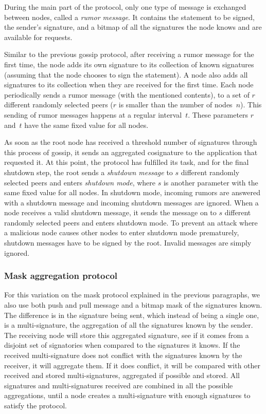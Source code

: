During the main part of the protocol, only one type of message is exchanged between nodes, called a \emph{rumor message}.
It contains the statement to be signed, the sender's  signature, and a bitmap of all the signatures the node knows and are available for requests. 

Similar to the previous gossip protocol, after receiving a rumor message for the first time, the node adds its own signature to its collection of known signatures (assuming that the node chooses to sign the statement).
A node also adds all signatures to its collection when they are received for the first time.
Each node periodically sends a rumor message (with the mentioned contents), to a set of $r$ different randomly selected peers ($r$ is smaller than the number of nodes~$n$).
This sending of rumor messages happens at a regular interval~$t$. These parameters $r$ and~$t$ have the same fixed value for all nodes.

As soon as the root node has received a threshold number of signatures through this process of gossip, it sends an aggregated cosignature to the application that requested it.
At this point, the protocol has fulfilled its task, and for the final shutdown step, the root sends a \emph{shutdown message} to $s$ different randomly selected peers and enters \emph{shutdown mode}, where $s$ is another parameter with the same fixed value for all nodes.
In shutdown mode, incoming rumors are answered with a shutdown message and incoming shutdown messages are ignored. When a node receives a valid shutdown message, it sends the message on to $s$ different randomly selected peers and enters shutdown mode. To prevent an attack where a malicious node causes other nodes to enter shutdown mode prematurely, shutdown messages have to be signed by the root.
Invalid messages are simply ignored.


\subsubsection{Mask aggregation protocol}

For this variation on the mask protocol explained in the previous paragraphs, we also use both push and pull message and a bitmap mask of the signatures known. The difference is in the signature being sent, which instead of being a single one, is a multi-signature, the aggregation of all the signatures known by the sender. The receiving node will store this aggregated signature, see if it comes from a disjoint set of signatories when compared to the signatures it knows. If the received multi-signature does not conflict with the signatures known by the receiver, it will aggregate them. If it does conflict, it will be compared with other received and stored multi-signatures, aggregated if possible and stored.
All signatures and multi-signatures received are combined in all the possible aggregations, until a node creates a multi-signature with enough signatures to satisfy the protocol.

